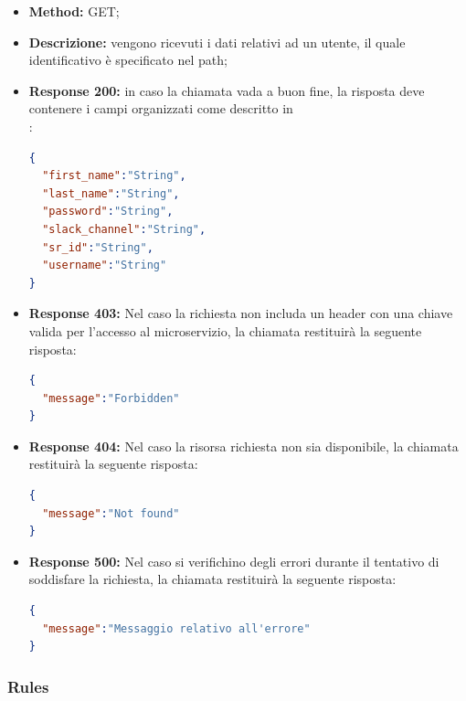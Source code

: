 \begin{itemize}
\begin{itemize}
\item \textbf{Method:} GET;
\item \textbf{Descrizione:} vengono ricevuti i dati relativi ad un utente, il quale identificativo è specificato nel path;
\item \textbf{Response 200:} in caso la chiamata vada a buon fine, la risposta deve contenere i campi organizzati come descritto in \\:
\begin{lstlisting}[language=json,firstnumber=1]
{
  "first_name":"String",
  "last_name":"String",
  "password":"String",
  "slack_channel":"String",
  "sr_id":"String",
  "username":"String"
}
\end{lstlisting}
\item \textbf{Response 403:} Nel caso la richiesta non includa un header  con una chiave valida per l'accesso al microservizio, la chiamata restituirà la seguente risposta:
\begin{lstlisting}[language=json,firstnumber=1]
{
  "message":"Forbidden"
}
\end{lstlisting}
\item \textbf{Response 404:} Nel caso la risorsa richiesta non sia disponibile, la chiamata restituirà la seguente risposta:
\begin{lstlisting}[language=json,firstnumber=1]
{
  "message":"Not found"
}
\end{lstlisting}
\item \textbf{Response 500:} Nel caso si verifichino degli errori durante il tentativo di soddisfare la richiesta, la chiamata restituirà la seguente risposta:
\begin{lstlisting}[language=json,firstnumber=1]
{
  "message":"Messaggio relativo all'errore"
}
\end{lstlisting}
\end{itemize}

\end{itemize}

\subsubsection{Rules}
